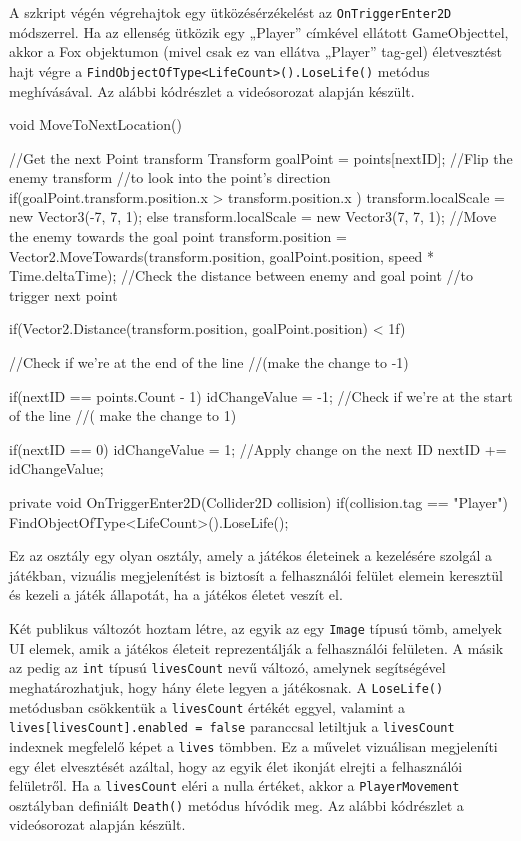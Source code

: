 A szkript végén végrehajtok egy ütközésérzékelést az \texttt{OnTriggerEnter2D} módszerrel. Ha az ellenség ütközik egy „Player” címkével ellátott GameObjecttel, akkor a Fox objektumon (mivel csak ez van ellátva „Player” tag-gel) életvesztést hajt végre a \texttt{FindObjectOfType<LifeCount>().LoseLife()} metódus meghívásával. Az alábbi kódrészlet a \cite{youtubeplaylist} videósorozat alapján készült.

\begin{java}
void MoveToNextLocation()
{
    //Get the next Point transform
    Transform goalPoint = points[nextID];
    //Flip the enemy transform
    //to look into the point's direction
    if(goalPoint.transform.position.x > 
        transform.position.x ) 
    {
        transform.localScale = new Vector3(-7, 7, 1);
    }
    else
    {
        transform.localScale = new Vector3(7, 7, 1);
    }
    //Move the enemy towards the goal point
    transform.position = 
        Vector2.MoveTowards(transform.position, 
        goalPoint.position, speed * Time.deltaTime);
    //Check the distance between enemy and goal point
    //to trigger next point

    if(Vector2.Distance(transform.position, 
        goalPoint.position) < 1f)
    {
        //Check if we're at the end of the line
        //(make the change to -1)

        if(nextID == points.Count - 1)
        {
            idChangeValue = -1;
        }
        //Check if we're at the start of the line
        //( make the change to 1)

        if(nextID == 0)
        {
            idChangeValue = 1;
        }
        //Apply change on the next ID
        nextID += idChangeValue;
    }
}

private void OnTriggerEnter2D(Collider2D collision)
{
    if(collision.tag == "Player")
    {
        FindObjectOfType<LifeCount>().LoseLife();
    }
}
\end{java}


Ez az osztály egy olyan osztály, amely a játékos életeinek a kezelésére szolgál a játékban, vizuális megjelenítést is biztosít a felhasználói felület elemein keresztül és kezeli a játék állapotát, ha a játékos életet veszít el.

Két publikus változót hoztam létre, az egyik az egy \texttt{Image} típusú tömb, amelyek UI elemek, amik a játékos életeit reprezentálják a felhasználói felületen. A másik az pedig az \texttt{int} típusú \texttt{livesCount} nevű változó, amelynek segítségével meghatározhatjuk, hogy hány élete legyen a játékosnak. A \texttt{LoseLife()} metódusban csökkentük a \texttt{livesCount} értékét eggyel, valamint a \texttt{lives[livesCount].enabled = false} paranccsal letiltjuk a \texttt{livesCount} indexnek megfelelő képet a \texttt{lives} tömbben. Ez a művelet vizuálisan megjeleníti egy élet elvesztését azáltal, hogy az egyik élet ikonját elrejti a felhasználói felületről. Ha a \texttt{livesCount} eléri a nulla értéket, akkor a \texttt{PlayerMovement} osztályban definiált \texttt{Death()} metódus hívódik meg. Az alábbi kódrészlet a \cite{youtubeplaylist} videósorozat alapján készült.

